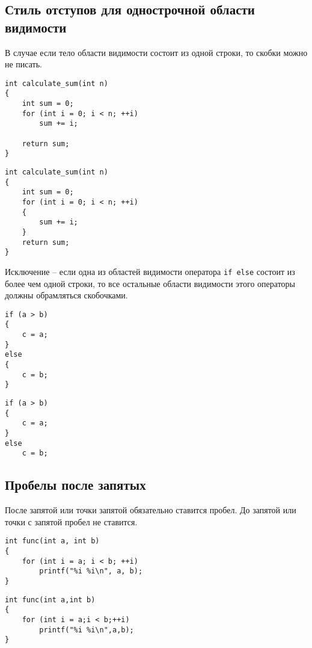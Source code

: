 \documentclass{article}
\begin{document}
\subsection*{Стиль отступов для однострочной области видимости}
В случае если тело области видимости состоит из одной строки, то скобки можно не писать.
\vspace{-2mm}
\begin{multicols}{2}
\begin{lstlisting}[backgroundcolor = \color{correctcolor}]
int calculate_sum(int n)
{
    int sum = 0;
    for (int i = 0; i < n; ++i)
        sum += i;
        
    return sum;
}
\end{lstlisting}
\vfill
\begin{lstlisting}[backgroundcolor = \color{correctcolor}]
int calculate_sum(int n)
{
    int sum = 0;
    for (int i = 0; i < n; ++i)
    {
        sum += i;
    }
    return sum;
}
\end{lstlisting}
\end{multicols}
Исключение -- если одна из областей видимости оператора \texttt{if else} состоит из более чем одной строки, то все остальные области видимости этого операторы должны обрамляться скобочками.
\begin{multicols}{2}
\noindent
\begin{lstlisting}[backgroundcolor = \color{correctcolor}]
if (a > b)
{
    c = a;
}
else
{
    c = b;
}
\end{lstlisting}
\vfill
\begin{lstlisting}[backgroundcolor = \color{wrongcolor}]
if (a > b)
{
    c = a;
}
else
    c = b;
\end{lstlisting}
\end{multicols}

\subsection*{Пробелы после запятых}
После запятой или точки запятой обязательно ставится пробел. До запятой или точки с запятой пробел не ставится.

\vspace{-7mm}
\begin{multicols}{2}
\begin{lstlisting}[backgroundcolor = \color{correctcolor}]
int func(int a, int b)
{
    for (int i = a; i < b; ++i)
        printf("%i %i\n", a, b);
}
\end{lstlisting}

\begin{lstlisting}[backgroundcolor = \color{wrongcolor}]
int func(int a,int b)
{
    for (int i = a;i < b;++i)
        printf("%i %i\n",a,b);
}
\end{lstlisting}
\end{multicols}
\end{document}

